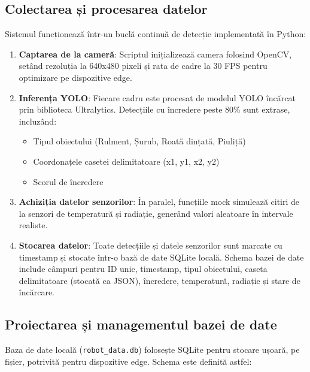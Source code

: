 \documentclass[12pt,a4paper]{article}
\begin{document}
\subsection{Colectarea și procesarea datelor}

Sistemul funcționează într-un buclă continuă de detecție implementată în Python:
\begin{enumerate}
\item \textbf{Captarea de la cameră}: Scriptul inițializează camera folosind OpenCV, setând rezoluția la 640x480 pixeli și rata de cadre la 30 FPS pentru optimizare pe dispozitive edge.
\item \textbf{Inferența YOLO}: Fiecare cadru este procesat de modelul YOLO încărcat prin biblioteca Ultralytics. Detecțiile cu încredere peste 80\% sunt extrase, incluzând:
  \begin{itemize}
  \item Tipul obiectului (Rulment, Șurub, Roată dințată, Piuliță)
  \item Coordonațele casetei delimitatoare (x1, y1, x2, y2)
  \item Scorul de încredere
  \end{itemize}
\item \textbf{Achiziția datelor senzorilor}: În paralel, funcțiile mock simulează citiri de la senzori de temperatură și radiație, generând valori aleatoare în intervale realiste.
\item \textbf{Stocarea datelor}: Toate detecțiile și datele senzorilor sunt marcate cu timestamp și stocate într-o bază de date SQLite locală. Schema bazei de date include câmpuri pentru ID unic, timestamp, tipul obiectului, caseta delimitatoare (stocată ca JSON), încredere, temperatură, radiație și stare de încărcare.
\end{enumerate}

\subsection{Proiectarea și managementul bazei de date}

Baza de date locală (\texttt{robot\_data.db}) folosește SQLite pentru stocare ușoară, pe fișier, potrivită pentru dispozitive edge. Schema este definită astfel:
\end{document}
